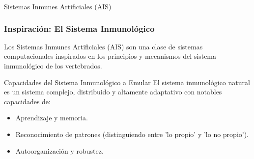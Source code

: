 \documentclass[aspectratio=169,xcolor=dvipsnames]{beamer}
\begin{document}
\begin{frame}{Sistemas Inmunes Artificiales (AIS)}
    \frametitle{Inspiración: El Sistema Inmunológico}
    \begin{block}{}
    Los Sistemas Inmunes Artificiales (AIS) son una clase de sistemas computacionales inspirados en los principios y mecanismos del sistema inmunológico de los vertebrados.
    \end{block}
    
    \begin{alertblock}{Capacidades del Sistema Inmunológico a Emular}
    El sistema inmunológico natural es un sistema complejo, distribuido y altamente adaptativo con notables capacidades de:
        \begin{itemize}
            \item Aprendizaje y memoria.
            \item Reconocimiento de patrones (distinguiendo entre 'lo propio' y 'lo no propio').
            \item Autoorganización y robustez.
        \end{itemize}
    \end{alertblock}
\end{frame}

\end{document}
